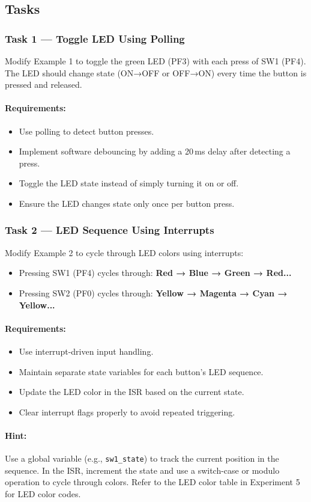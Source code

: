 \subsection{Tasks}

\subsubsection{Task 1 — Toggle LED Using Polling}

Modify Example 1 to toggle the green LED (PF3) with each press of SW1 (PF4). The LED should change state (ON→OFF or OFF→ON) every time the button is pressed and released.

\paragraph{Requirements:}
\begin{itemize}[nosep]
  \item Use polling to detect button presses.
  \item Implement software debouncing by adding a 20\,ms delay after detecting a press.
  \item Toggle the LED state instead of simply turning it on or off.
  \item Ensure the LED changes state only once per button press.
\end{itemize}

\medskip


\subsubsection{Task 2 — LED Sequence Using Interrupts}

Modify Example 2 to cycle through LED colors using interrupts:
\begin{itemize}[nosep]
  \item Pressing SW1 (PF4) cycles through: \textbf{Red → Blue → Green → Red...}
  \item Pressing SW2 (PF0) cycles through: \textbf{Yellow → Magenta → Cyan → Yellow...}
\end{itemize}

\paragraph{Requirements:}
\begin{itemize}[nosep]
  \item Use interrupt-driven input handling.
  \item Maintain separate state variables for each button's LED sequence.
  \item Update the LED color in the ISR based on the current state.
  \item Clear interrupt flags properly to avoid repeated triggering.
\end{itemize}

\paragraph{Hint:}
Use a global variable (e.g., \texttt{sw1\_state}) to track the current position in the sequence. In the ISR, increment the state and use a switch-case or modulo operation to cycle through colors. Refer to the LED color table in Experiment 5 for LED color codes.